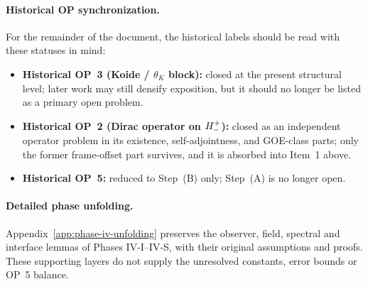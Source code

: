 \paragraph{Historical OP synchronization.}
For the remainder of the document, the historical labels should be read with
these statuses in mind:
\begin{itemize}[leftmargin=2em]
  \item \textbf{Historical OP~3 (Koide / $\theta_K$ block):} closed at the
        present structural level; later work may still densify exposition, but
        it should no longer be listed as a primary open problem.
  \item \textbf{Historical OP~2 (Dirac operator on $H^+_-$):} closed as
        an independent operator problem in its existence, self-adjointness,
        and GOE-class parts; only the former frame-offset part survives, and
        it is absorbed into Item~1 above.
  \item \textbf{Historical OP~5:} reduced to Step~(B) only; Step~(A) is no
        longer open.
\end{itemize}




\paragraph{Detailed phase unfolding.}
Appendix~\ref{app:phase-iv-unfolding} preserves the observer, field,
spectral and interface lemmas of Phases IV-I--IV-S, with their
original assumptions and proofs. These supporting layers do not
supply the unresolved constants, error bounds or OP~5 balance.
